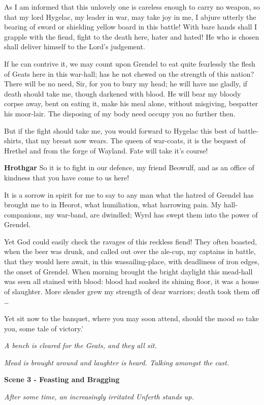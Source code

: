 \documentclass[a4paper]{article}
\begin{document}
{As I am informed that this unlovely one
is careless enough to carry no weapon,
so that my lord Hygelac, my leader in war,
may take joy in me, I abjure utterly
the bearing of sword or shielding yellow
board in this battle! With bare hands shall I
grapple with the fiend, fight to the death here,
hater and hated! He who is chosen
shall deliver himself to the Lord’s judgement.

If he can contrive it, we may count upon Grendel
to eat quite fearlessly the flesh of Geats
here in this war-hall; has he not chewed
on the strength of this nation? There will be no need, Sir,
for you to bury my head; he will have me gladly,
if death should take me, though darkened with blood.
He will bear my bloody corpse away, bent on eating it,
make his meal alone, without misgiving,
bespatter his moor-lair. The disposing of my body
need occupy you no further then.

But if the fight should take me, you would forward to Hygelac
this best of battle-shirts, that my breast now wears.
The queen of war-coats, it is the bequest of Hrethel
and from the forge of Wayland. 
Fate will take it's course!

\textbf{Hrothgar} So it is to fight in our defence, my friend Beowulf,
and as an office of kindness that you have come to us here!

It is a sorrow in spirit for me to say to any man
what the hatred of Grendel has brought me to in Heorot, 
what humiliation, what harrowing pain. 
My hall-companions, my war-band, are dwindled; 
Wyrd has swept them into the power of Grendel.

Yet God could easily check the ravages of this reckless fiend!
They often boasted, when the beer was drunk,
and called out over the ale-cup, my captains in battle,
that they would here await, in this wassailing-place,
with deadliness of iron edges, the onset of Grendel.
When morning brought the bright daylight
this mead-hall was seen all stained with blood:
blood had soaked its shining floor,
it was a house of slaughter. More slender grew my
strength of dear warriors; death took them off …

Yet sit now to the banquet, where you may soon attend,
should the mood so take you, some tale of victory.’

\centerline{\textit{A bench is cleared for the Geats, and they all sit.}}
\centerline{\textit{Mead is brought around and laughter is heard. Talking amongst the cast.}}

\centerline{\textbf{Scene 3 - Feasting and Bragging}}
\centerline{\textit{After some time, an increasingly irritated Unferth stands up.}}

}
\end{document}
